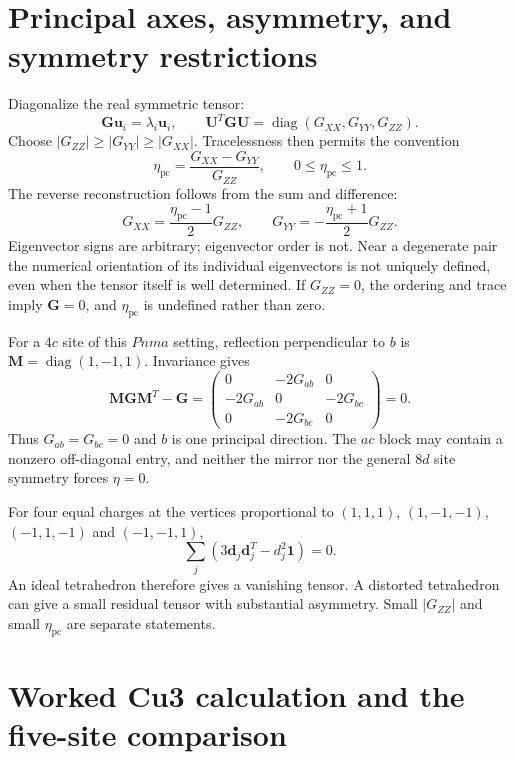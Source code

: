 \documentclass[11pt,a4paper]{article}
\newcommand{\diag}{\operatorname{diag}}
\newcommand{\Id}{\mathbf 1}
\newcommand{\G}{\bm G}
\newcommand{\etapc}{\eta_{\mathrm{pc}}}
\begin{document}
\section{Principal axes, asymmetry, and symmetry restrictions}

Diagonalize the real symmetric tensor:
\begin{equation}
 \G\bm u_i=\lambda_i\bm u_i,\qquad
 \bm U^T\G\bm U=\diag(G_{XX},G_{YY},G_{ZZ}).
\end{equation}
Choose $|G_{ZZ}|\geq|G_{YY}|\geq|G_{XX}|$. Tracelessness then permits the
convention
\begin{equation}
 \etapc=\frac{G_{XX}-G_{YY}}{G_{ZZ}},\qquad0\leq\etapc\leq1.
\end{equation}
The reverse reconstruction follows from the sum and difference:
\begin{equation}
 G_{XX}=\frac{\etapc-1}{2}G_{ZZ},\qquad
 G_{YY}=-\frac{\etapc+1}{2}G_{ZZ}.
\end{equation}
Eigenvector signs are arbitrary; eigenvector order is not. Near a degenerate
pair the numerical orientation of its individual eigenvectors is not uniquely
defined, even when the tensor itself is well determined. If $G_{ZZ}=0$, the
ordering and trace imply $\G=0$, and $\etapc$ is undefined rather than zero.

For a $4c$ site of this $Pnma$ setting, reflection perpendicular to $b$ is
$\bm M=\diag(1,-1,1)$. Invariance gives
\begin{equation}
 \bm M\G\bm M^T-\G=
 \begin{pmatrix}0&-2G_{ab}&0\\-2G_{ab}&0&-2G_{bc}\\0&-2G_{bc}&0\end{pmatrix}
 =0.
\end{equation}
Thus $G_{ab}=G_{bc}=0$ and $b$ is one principal direction. The $ac$ block may
contain a nonzero off-diagonal entry, and neither the mirror nor the general
$8d$ site symmetry forces $\eta=0$.

For four equal charges at the vertices proportional to
$(1,1,1)$, $(1,-1,-1)$, $(-1,1,-1)$ and $(-1,-1,1)$,
\begin{equation}
 \sum_j \left(3\bm d_j\bm d_j^T-d_j^2\Id\right)=0.
\end{equation}
An ideal tetrahedron therefore gives a vanishing tensor. A distorted tetrahedron
can give a small residual tensor with substantial asymmetry. Small $|G_{ZZ}|$
and small $\etapc$ are separate statements.

\section{Worked Cu3 calculation and the five-site comparison}
\end{document}
